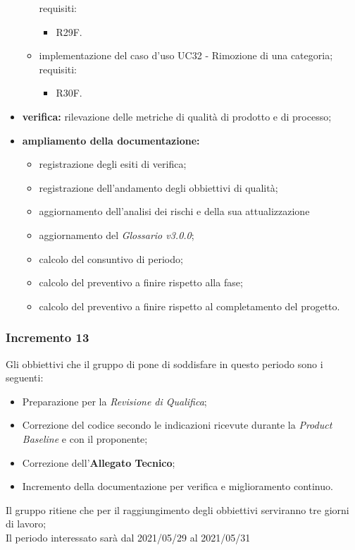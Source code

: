 \begin{itemize}
\begin{itemize}
                    requisiti:
                    \begin{itemize}
                        \item R29F.
                    \end{itemize}
              \item implementazione del caso d'uso UC32 -  Rimozione di una categoria;\\
                    requisiti:
                    \begin{itemize}
                        \item R30F.
                    \end{itemize}
          \end{itemize}
    \item \textbf{verifica:} rilevazione delle metriche di qualità di prodotto e di processo;
    \item \textbf{ampliamento della documentazione:}
          \begin{itemize}
              \item registrazione degli esiti di verifica;
              \item registrazione dell'andamento degli obbiettivi di qualità;
              \item aggiornamento dell'analisi dei rischi e della sua attualizzazione
              \item aggiornamento del \textit{Glossario v3.0.0};
              \item calcolo del consuntivo di periodo;
              \item calcolo del preventivo a finire rispetto alla fase;
              \item calcolo del preventivo a finire rispetto al completamento del progetto.
          \end{itemize}
\end{itemize}

\subsubsection{Incremento 13}
Gli obbiettivi che il gruppo di pone di soddisfare in questo periodo sono i seguenti:
\begin{itemize}
    \item Preparazione per la \textit{Revisione di Qualifica};
    \item Correzione del codice secondo le indicazioni ricevute durante la \textit{Product Baseline} e con il proponente;
    \item Correzione dell'\textbf{Allegato Tecnico};
    \item Incremento della documentazione per verifica e miglioramento continuo.
\end{itemize}
Il gruppo ritiene che per il raggiungimento degli obbiettivi serviranno tre giorni di lavoro;\\
Il periodo interessato sarà dal 2021/05/29 al 2021/05/31

